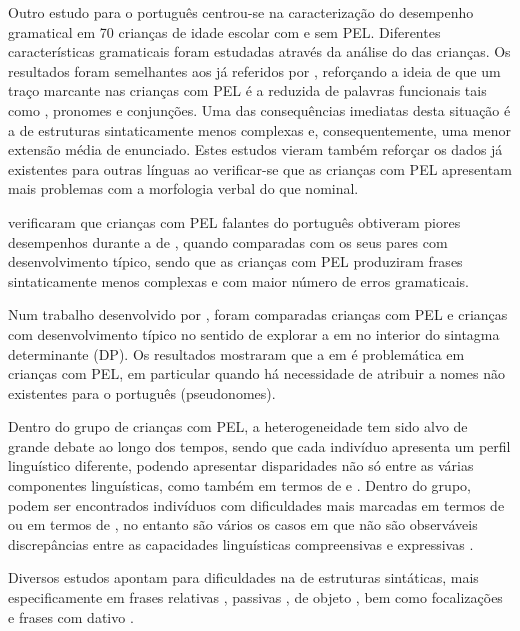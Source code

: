 \documentclass[output=paper]{LSP/langsci}
\begin{document}
\largerpage Outro estudo para o português \citep{araujo2007} centrou-se na caracterização do desempenho gramatical em 70 crianças de idade escolar com e sem PEL. Diferentes características gramaticais foram estudadas através da análise do  das crianças. Os resultados foram semelhantes aos já referidos por \cite{puglisi_etal2005}, reforçando a ideia de que um traço marcante nas crianças com PEL é a reduzida  de palavras funcionais tais como , pronomes e conjunções. Uma das consequências imediatas desta situação é a  de estruturas sintaticamente menos complexas e, consequentemente, uma menor extensão média de enunciado. Estes estudos vieram também reforçar os dados já existentes para outras línguas ao verificar-se que as crianças com PEL apresentam mais problemas com a morfologia verbal do que nominal. 

\cite{befilopes_etal2008} verificaram que crianças com PEL falantes do português obtiveram piores desempenhos durante a  de , quando comparadas com os seus pares com desenvolvimento típico, sendo que as crianças com PEL produziram frases sintaticamente menos complexas e com maior número de erros gramaticais.

Num trabalho desenvolvido por \cite{silveira2011}, foram comparadas crianças com PEL e crianças com desenvolvimento típico no sentido de explorar a  em  no interior do sintagma determinante (DP). Os resultados mostraram que a  em  é problemática em crianças com PEL, em particular quando há necessidade de atribuir  a nomes não existentes para o português (pseudonomes). 

Dentro do grupo de crianças com PEL, a heterogeneidade tem sido alvo de grande debate ao longo dos tempos, sendo que cada indivíduo apresenta um perfil linguístico diferente, podendo apresentar disparidades não só entre as várias componentes linguísticas, como também em termos de  e . Dentro do grupo, podem ser encontrados indivíduos com dificuldades mais marcadas em termos de  ou em termos de , no entanto são vários os casos em que não são observáveis discrepâncias entre as capacidades linguísticas compreensivas e expressivas \citep{gillamkamhi2010}. 

Diversos estudos apontam para dificuldades na  de estruturas sintáticas, mais especificamente em frases relativas \citep{friedmannnovogrodsky2004,costa_etal2009}, passivas \citep{vanderlely1996},  de objeto \citep{friedmannnovogrodsky2011}, bem como focalizações e frases com  dativo \citep{vanderlelyharris1990,friedmannnovogrodsky2007}.
\end{document}
